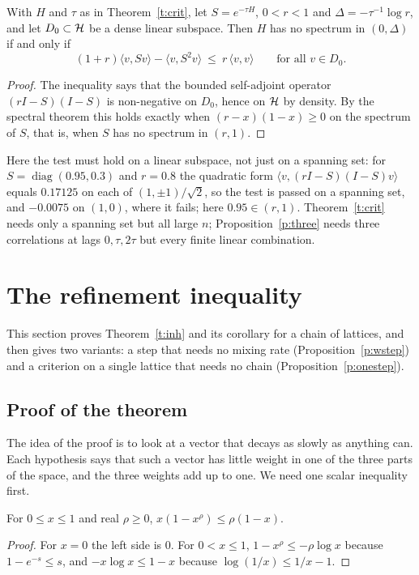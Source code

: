 \begin{proposition}\label{p:three}
With $H$ and $\tau$ as in Theorem~\ref{t:crit}, let $S=e^{-\tau H}$, $0<r<1$ and $\Delta=-\tau^{-1}\log r$, and let
$D_0\subset\mathcal{H}$ be a dense linear subspace. Then $H$ has no spectrum in $(0,\Delta)$ if and only if
\[
(1+r)\langle v,Sv\rangle-\langle v,S^2v\rangle\ \le\ r\,\langle v,v\rangle\qquad\text{for all }v\in D_0 .
\]
\end{proposition}
\begin{proof}
The inequality says that the bounded self-adjoint operator $(rI-S)(I-S)$ is non-negative on $D_0$, hence on
$\mathcal{H}$ by density. By the spectral theorem this holds exactly when $(r-x)(1-x)\ge0$ on the spectrum of $S$,
that is, when $S$ has no spectrum in $(r,1)$.
\end{proof}

\begin{remark}\label{r:three}
Here the test must hold on a linear subspace, not just on a spanning set: for $S=\operatorname{diag}(0.95,0.3)$
and $r=0.8$ the quadratic form $\langle v,(rI-S)(I-S)v\rangle$ equals $0.17125$ on each of $(1,\pm1)/\sqrt2$,
so the test is passed on a spanning set, and $-0.0075$ on $(1,0)$, where it fails; here $0.95\in(r,1)$. Theorem~\ref{t:crit} needs only a
spanning set but all large $n$; Proposition~\ref{p:three} needs three correlations at lags $0,\tau,2\tau$ but
every finite linear combination.
\end{remark}

\section{The refinement inequality}\label{s:inh}
This section proves Theorem~\ref{t:inh} and its corollary for a chain of lattices, and then gives two
variants: a step that needs no mixing rate (Proposition~\ref{p:wstep}) and a criterion on a single lattice
that needs no chain (Proposition~\ref{p:onestep}).

\subsection*{Proof of the theorem}
The idea of the proof is to look at a vector that decays as slowly as anything can. Each hypothesis says that
such a vector has little weight in one of the three parts of the space, and the three weights add up to one.
We need one scalar inequality first.

\begin{lemma}\label{l:scal}
For $0\le x\le1$ and real $\rho\ge0$, $x(1-x^\rho)\le\rho(1-x)$.
\end{lemma}
\begin{proof}
For $x=0$ the left side is $0$. For $0<x\le1$, $1-x^\rho\le-\rho\log x$ because $1-e^{-s}\le s$, and
$-x\log x\le1-x$ because $\log(1/x)\le1/x-1$.
\end{proof}

